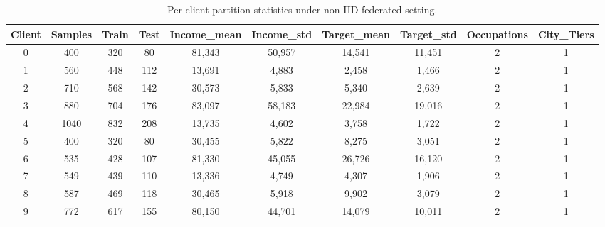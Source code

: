 \begin{table}
\caption{Per-client partition statistics under non-IID federated setting.}
\label{tab:per-client}
\begin{tabular}{cccccccccc}
\toprule
Client & Samples & Train & Test & Income\_mean & Income\_std & Target\_mean & Target\_std & Occupations & City\_Tiers \\
\midrule
0 & 400 & 320 & 80 & 81,343 & 50,957 & 14,541 & 11,451 & 2 & 1 \\
1 & 560 & 448 & 112 & 13,691 & 4,883 & 2,458 & 1,466 & 2 & 1 \\
2 & 710 & 568 & 142 & 30,573 & 5,833 & 5,340 & 2,639 & 2 & 1 \\
3 & 880 & 704 & 176 & 83,097 & 58,183 & 22,984 & 19,016 & 2 & 1 \\
4 & 1040 & 832 & 208 & 13,735 & 4,602 & 3,758 & 1,722 & 2 & 1 \\
5 & 400 & 320 & 80 & 30,455 & 5,822 & 8,275 & 3,051 & 2 & 1 \\
6 & 535 & 428 & 107 & 81,330 & 45,055 & 26,726 & 16,120 & 2 & 1 \\
7 & 549 & 439 & 110 & 13,336 & 4,749 & 4,307 & 1,906 & 2 & 1 \\
8 & 587 & 469 & 118 & 30,465 & 5,918 & 9,902 & 3,079 & 2 & 1 \\
9 & 772 & 617 & 155 & 80,150 & 44,701 & 14,079 & 10,011 & 2 & 1 \\
\bottomrule
\end{tabular}
\end{table}

